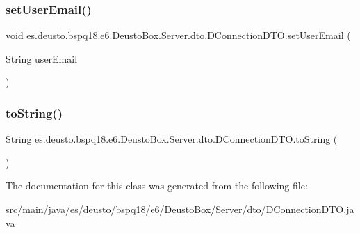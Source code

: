 \subsubsection{\texorpdfstring{set\+User\+Email()}{setUserEmail()}}
{\footnotesize\ttfamily void es.\+deusto.\+bspq18.\+e6.\+Deusto\+Box.\+Server.\+dto.\+D\+Connection\+D\+T\+O.\+set\+User\+Email (\begin{DoxyParamCaption}\item[{String}]{user\+Email }\end{DoxyParamCaption})}

\mbox{\label{classes_1_1deusto_1_1bspq18_1_1e6_1_1_deusto_box_1_1_server_1_1dto_1_1_d_connection_d_t_o_a5815999a995b62fac61041db01b19bf0}} 
\subsubsection{\texorpdfstring{to\+String()}{toString()}}
{\footnotesize\ttfamily String es.\+deusto.\+bspq18.\+e6.\+Deusto\+Box.\+Server.\+dto.\+D\+Connection\+D\+T\+O.\+to\+String (\begin{DoxyParamCaption}{ }\end{DoxyParamCaption})}



The documentation for this class was generated from the following file\+:\begin{DoxyCompactItemize}
\item 
src/main/java/es/deusto/bspq18/e6/\+Deusto\+Box/\+Server/dto/\mbox{\hyperlink{_d_connection_d_t_o_8java}{D\+Connection\+D\+T\+O.\+java}}\end{DoxyCompactItemize}
